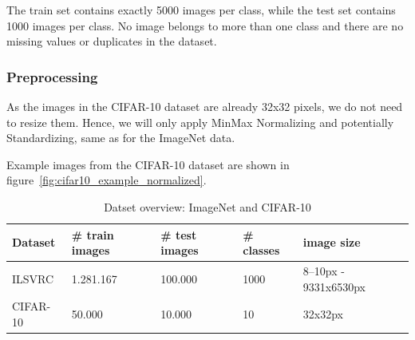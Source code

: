 The train set contains exactly 5000 images per class, while the test set contains 1000 images per class.
No image belongs to more than one class and there are no missing values or duplicates in the dataset.

\subsubsection{Preprocessing}
As the images in the CIFAR-10 dataset are already 32x32 pixels, we do not need to resize them.
Hence, we will only apply MinMax Normalizing and potentially Standardizing, same as for the ImageNet data.

Example images from the CIFAR-10 dataset are shown in figure~\ref{fig:cifar10_example_normalized}.

\begin{table}[]
    \begin{tabular}{lllll}
        Dataset  & \# train images & \# test images & \# classes & image size           \\ \hline \hline
        ILSVRC   & 1.281.167       & 100.000        & 1000       & 8--10px - 9331x6530px \\
        CIFAR-10 & 50.000          & 10.000         & 10         & 32x32px              \\ \hline \hline
    \end{tabular}
    \caption{Datset overview: ImageNet and CIFAR-10}
    \label{tab:datasets}
\end{table}
